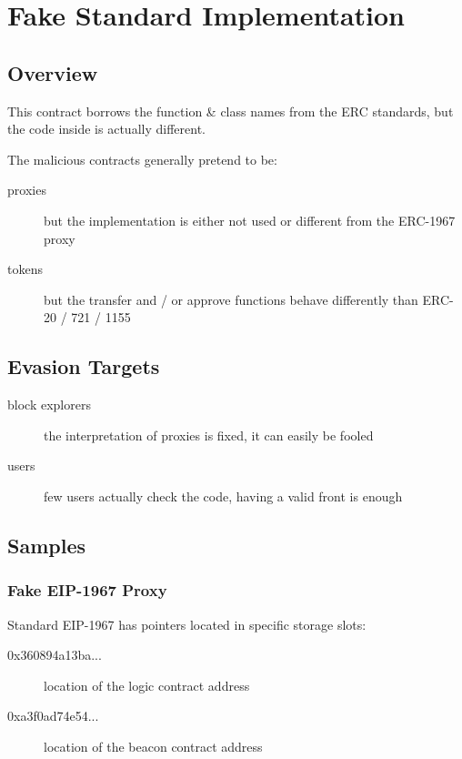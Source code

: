 \section{Fake Standard Implementation} \label{sec:fake-implementation}

\subsection{Overview}

This contract borrows the function \& class names from the ERC standards, but the code inside is actually different.

The malicious contracts generally pretend to be:

\begin{description}
\item[proxies]{but the implementation is either not used or different from the ERC-1967 proxy}
\item[tokens]{but the transfer and / or approve functions behave differently than ERC-20 / 721 / 1155}
\end{description}

\subsection{Evasion Targets}

\begin{description}
\item[block explorers]{the interpretation of proxies is fixed, it can easily be fooled}
\item[users]{few users actually check the code, having a valid front is enough}
\end{description}

\subsection{Samples}

\subsubsection{Fake EIP-1967 Proxy}

Standard EIP-1967 \cite{eip-1967} has pointers located in specific storage slots:

\begin{description}
\item[0x360894a13ba...]{location of the logic contract address}
\item[0xa3f0ad74e54...]{location of the beacon contract address}
\end{description}

